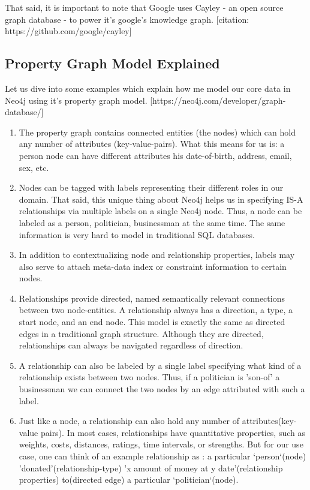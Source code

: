 That said, it is important to note that Google uses Cayley - an open source graph database -  to power it's google's knowledge graph. [citation: https://github.com/google/cayley] 


\subsection{Property Graph Model Explained}

Let us dive into some examples which explain how me model our core data in Neo4j using it's property graph model. [https://neo4j.com/developer/graph-database/] \\

\begin{enumerate}

\item The property graph contains connected entities (the nodes) which can hold any number of attributes (key-value-pairs). What this means for us is: a person node can have different attributes his date-of-birth, address, email, sex, etc.

\item Nodes can be tagged with labels representing their different roles in our domain. That said, this unique thing about Neo4j helps us in specifying IS-A relationships via multiple labels on a single Neo4j node. Thus, a node can be labeled as a person, politician, businessman at the same time. The same information is very hard to model in traditional SQL databases.

\item In addition to contextualizing node and relationship properties, labels may also serve to attach meta-data index or constraint information to certain nodes.

\item Relationships provide directed, named semantically relevant connections between two node-entities. A relationship always has a direction, a type, a start node, and an end node. This model is exactly the same as directed edges in a traditional graph structure. Although they are directed, relationships can always be navigated regardless of direction.

\item A relationship can also be labeled by a single label specifying what kind of a relationship exists between two nodes. Thus, if a politician is 'son-of' a businessman we can connect the two nodes by an edge attributed with such a label.

\item Just like a node, a relationship can also hold any number of attributes(key-value pairs). In most cases, relationships have quantitative properties, such as weights, costs, distances, ratings, time intervals, or strengths. But for our use case, one can think of an example relationship as : a particular `person`(node) 'donated'(relationship-type) 'x amount of money at y date'(relationship properties) to(directed edge) a particular `politician`(node).


\end{enumerate}
